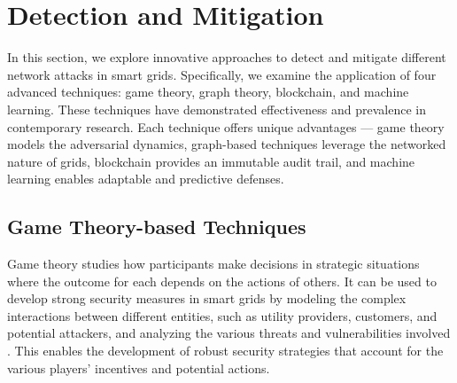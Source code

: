 \documentclass[10pt, journal]{IEEEtran}
\begin{document}
\section{Detection and Mitigation}
\label{section:detection}

In this section, we explore innovative approaches to detect and mitigate different network attacks in smart grids. Specifically, we examine the application of four advanced techniques: game theory, graph theory, blockchain, and machine learning. These techniques have demonstrated effectiveness and prevalence in contemporary research. Each technique offers unique advantages — game theory models the adversarial dynamics, graph-based techniques leverage the networked nature of grids, blockchain provides an immutable audit trail, and machine learning enables adaptable and predictive defenses.




\subsection{Game Theory-based Techniques}

Game theory studies how participants make decisions in strategic situations where the outcome for each depends on the actions of others. It can be used to develop strong security measures in smart grids by modeling the complex interactions between different entities, such as utility providers, customers, and potential attackers, and analyzing the various threats and vulnerabilities involved \cite{saad2012game}. This enables the development of robust security strategies that account for the various players' incentives and potential actions.
\end{document}
